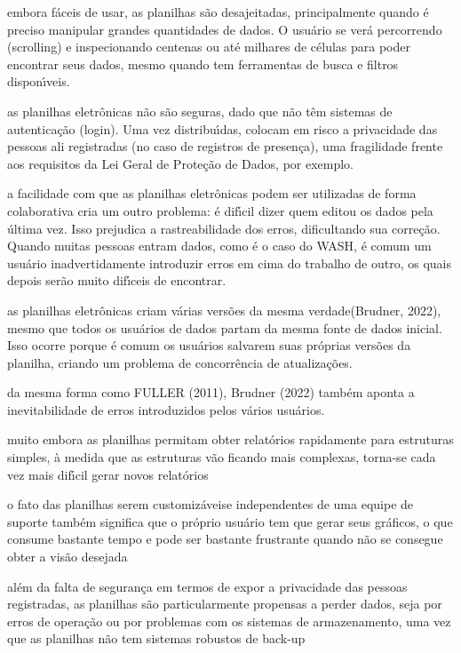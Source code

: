 \documentclass[
12pt,		%
openright,	%
twoside,  %
a4paper,			%
chapter=TITLE,		%
english,			%
french,				%
spanish,			%
brazil				%
]{USPSC-classe/USPSC_RedarTex}
\begin{document}
\begin{alineas}
\item embora f\'aceis de usar, as planilhas s\~ao desajeitadas, principalmente quando \'e preciso manipular grandes quantidades de dados. O usu\'ario se ver\'a percorrendo (scrolling) e inspecionando centenas ou at\'e milhares de c\'elulas para poder encontrar seus dados, mesmo quando tem ferramentas de busca e filtros dispon\'{\i}veis.
\item as planilhas eletr\^onicas n\~ao s\~ao seguras, dado que n\~ao t\^em sistemas de autentica\c{c}\~ao (login). Uma vez distribu\'{\i}das, colocam em risco a privacidade das pessoas ali registradas (no caso de registros de presen\c{c}a), uma fragilidade frente aos requisitos da Lei Geral de Prote\c{c}\~ao de Dados, por exemplo.
\item a facilidade com que as planilhas eletr\^onicas podem ser utilizadas de forma colaborativa cria um outro problema: \'e dif\'{\i}cil dizer quem editou os dados pela \'ultima vez. Isso prejudica a rastreabilidade dos erros, dificultando sua corre\c{c}\~ao. Quando muitas pessoas entram dados, como \'e o caso do WASH, \'e comum um usu\'ario inadvertidamente introduzir erros em cima do trabalho de outro, os quais depois ser\~ao muito dif\'{\i}ceis de encontrar.
\item as planilhas eletr\^onicas criam v\'arias vers\~oes da mesma \textquotedbl verdade\textquotedbl   (Brudner, 2022), mesmo que todos os usu\'arios de dados partam da mesma fonte de dados inicial. Isso ocorre porque \'e comum os usu\'arios salvarem suas pr\'oprias vers\~oes da planilha, criando um problema de concorr\^encia de atualiza\c{c}\~oes.
\item da mesma forma como  FULLER (2011),  Brudner (2022) tamb\'em aponta a inevitabilidade de erros introduzidos pelos v\'arios usu\'arios.
\item muito embora as planilhas permitam obter relat\'orios rapidamente para estruturas simples, \`a medida que as estruturas v\~ao ficando mais complexas, torna-se cada vez mais dif\'{\i}cil gerar novos relat\'orios
\item o fato das planilhas serem \textquotedbl customiz\'aveis\textquotedbl  e independentes de uma equipe de suporte tamb\'em significa que o pr\'oprio usu\'ario tem que gerar seus gr\'aficos, o que consume bastante tempo e pode ser bastante frustrante quando n\~ao se consegue obter a vis\~ao desejada
\item al\'em da falta de seguran\c{c}a em termos de expor a privacidade das pessoas registradas, as planilhas s\~ao particularmente propensas a perder dados, seja por erros de opera\c{c}\~ao ou por problemas com os sistemas de armazenamento, uma vez que as planilhas n\~ao tem sistemas robustos de \textquotedbl back-up\textquotedbl 

\end{alineas}
\end{document}
